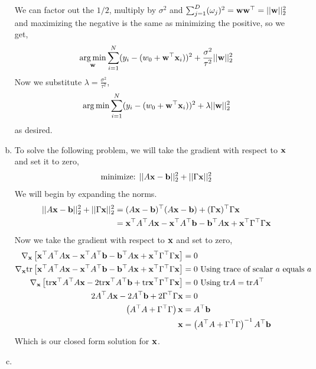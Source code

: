 \documentclass[12pt,letterpaper,fleqn]{hmcpset}
\begin{document}
\begin{enumerate}[(a)]
            We can factor out the $1/2$, multiply by $\sigma^2$ and $\sum_{j=1}^D (\omega_j)^2 = {\bf w} {\bf w}^\top = ||{\bf w}||_2^2$ and maximizing the negative is the same as minimizing the positive, so we get,
                $$  \operatorname*{arg\,min}_{\bf w} \sum_{i=1}^N (y_i-(w_0 + {\bf w}^\top{\bf x}_i))^2 + \frac{\sigma^2}{\tau^2} ||{\bf w}||_2^2$$
            Now we substitute $\lambda = \frac{\sigma^2}{\tau^2}$,
                \[
                \operatorname*{arg\,min} \sum_{i=1}^N (y_i - (w_0 + {\bf w}^\top{\bf x}_i))^2 + \lambda||{\bf w}||_2^2
                \]
            as desired.
    \item
        To solve the following problem, we will take the gradient with respect to ${\bf x}$ and set it to zero,
            $$\text{minimize: } ||A{\bf x} - {\bf b}||_2^2 + ||\Gamma{\bf x}||_2^2$$
        We will begin by expanding the norms.
            \begin{align*}
                ||A{\bf x} - {\bf b}||_2^2 + ||\Gamma{\bf x}||_2^2 &= (A{\bf x} - {\bf b})^\top(A{\bf x} - {\bf b}) + (\Gamma {\bf x})^\top \Gamma {\bf x} \\
                &= {\bf x}^\top A^\top A {\bf x} - {\bf x}^\top A^\top {\bf b} - {\bf b}^\top A {\bf x} + {\bf x}^\top \Gamma^\top \Gamma {\bf x} \\ 
            \end{align*}
        Now we take the gradient with respect to ${\bf x}$ and set to zero,
            \begin{align*}
                \nabla_{\bf x} \left[ {\bf x}^\top A^\top A {\bf x} - {\bf x}^\top A^\top {\bf b} - {\bf b}^\top A {\bf x} + {\bf x}^\top \Gamma^\top \Gamma {\bf x}  \right]&= 0\\
                 \nabla_{\bf x} {\hbox{tr}} \left[ {\bf x}^\top A^\top A {\bf x} - {\bf x}^\top A^\top {\bf b} - {\bf b}^\top A {\bf x} + {\bf x}^\top \Gamma^\top \Gamma {\bf x}  \right] &= 0 \text{   Using trace of scalar $a$ equals $a$} \\
                 \nabla_{\bf x} \left[ {\hbox{tr}} {\bf x}^\top A^\top A {\bf x} - 2{\hbox{tr}} {\bf x}^\top A^\top {\bf b} + {\hbox{tr}} {\bf x}^\top \Gamma^\top \Gamma {\bf x}  \right] &= 0 \text{   Using ${\hbox{tr}} A = {\hbox{tr}} A^\top$}\\
                 2A^\top A {\bf x} -2A^\top {\bf b} + 2\Gamma^\top \Gamma {\bf x} &= 0\\
                 \left( A^\top A + \Gamma^\top \Gamma \right) {\bf x} &= A^\top{\bf b} \\
                 {\bf x} &= \left( A^\top A + \Gamma^\top \Gamma \right)^{-1} A^\top {\bf b}
            \end{align*}
        Which is our closed form solution for ${\bf x}$.
    \item
        

\end{enumerate}
\end{document}
